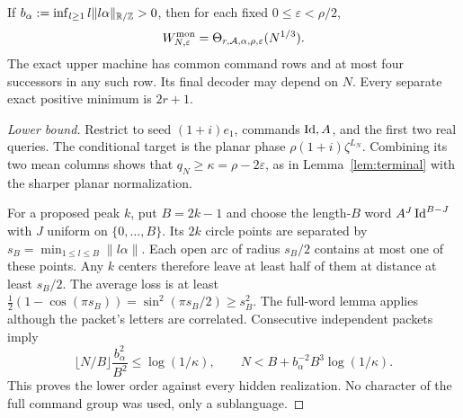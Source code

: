 \begin{theorem}\label{thm:monomial}
If $b_\alpha:=\inf_{l\ge1}l\|l\alpha\|_{\mathbb R/\mathbb Z}>0$, then
for each fixed $0\le\varepsilon<\rho/2$,
\begin{equation}\label{eq:monomial-width}
 W^{\rm mon}_{N,\varepsilon}
 =\Theta_{r,\mathcal A,\alpha,\rho,\varepsilon}(N^{1/3}).
\end{equation}
The exact upper machine has common command rows and at most four
successors in any such row. Its final decoder may depend on $N$.
Every separate exact positive minimum is $2r+1$.
\end{theorem}
\begin{proof}[Lower bound]
Restrict to seed $(1+i)e_1$, commands $\operatorname{Id},A$, and the first two real
queries. The conditional target is the planar phase
$\rho(1+i)\zeta^{L_N}$. Combining its two mean columns shows that
$q_N\ge\kappa=\rho-2\varepsilon$, as in Lemma~\ref{lem:terminal} with
the sharper planar normalization.

For a proposed peak $k$, put $B=2k-1$ and choose the length-$B$ word
$A^J\operatorname{Id}^{B-J}$ with $J$ uniform on $\{0,\ldots,B\}$. Its $2k$ circle
points are separated by
$s_B=\min_{1\le l\le B}\|l\alpha\|$. Each open arc of radius $s_B/2$
contains at most one of these points. Any $k$ centers therefore leave
at least half of them at distance at least $s_B/2$. The average loss is
at least
$\tfrac12(1-\cos(\pi s_B))=\sin^2(\pi s_B/2)\ge s_B^2$.
The full-word lemma applies although the packet's letters are correlated.
Consecutive independent packets imply
\[
 \lfloor N/B\rfloor\frac{b_\alpha^2}{B^2}
 \le\log(1/\kappa),\qquad
 N<B+b_\alpha^{-2}B^3\log(1/\kappa).
\]
This proves the lower order against every hidden realization. No
character of the full command group was used, only a sublanguage.
\end{proof}


